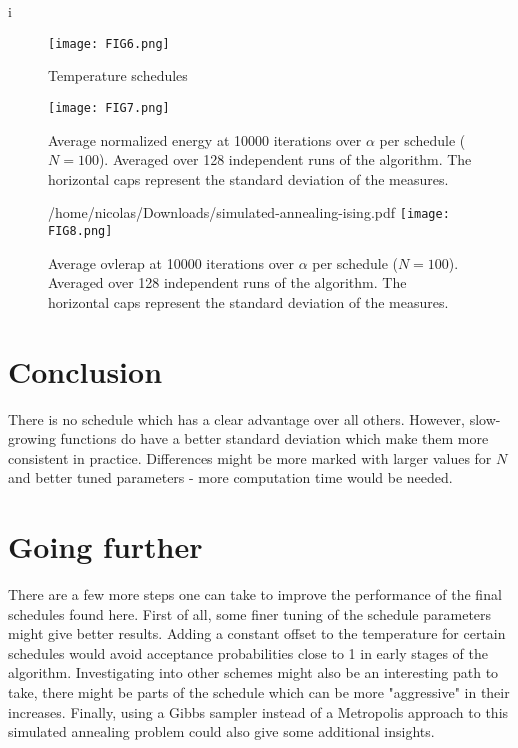 i\documentclass[a4paper]{article}
\begin{document}
\begin{figure}
\centering
\texttt{[image: FIG6.png]}
\caption{\label{fig:FIG6}Temperature schedules}
\end{figure}

\begin{figure}
\centering
\texttt{[image: FIG7.png]}
\caption{\label{fig:FIG7}Average normalized energy at 10000 iterations over $\alpha$ per schedule ($N = 100$). Averaged over 128 independent runs of the algorithm. The horizontal caps represent the standard deviation of the measures.}
\end{figure}

\begin{figure}
\centering/home/nicolas/Downloads/simulated-annealing-ising.pdf
\texttt{[image: FIG8.png]}
\caption{\label{fig:FIG8}Average ovlerap at 10000 iterations over $\alpha$ per schedule ($N = 100$). Averaged over 128 independent runs of the algorithm. The horizontal caps represent the standard deviation of the measures.}
\end{figure}

\section{Conclusion}
There is no schedule which has a clear advantage over all others. However, slow-growing functions do have a better standard deviation which make them more consistent in practice. Differences might be more marked with larger values for $N$ and better tuned parameters - more computation time would be needed.

\section{Going further}
There are a few more steps one can take to improve the performance of the final schedules found here. First of all, some finer tuning of the schedule parameters might give better results. Adding a constant offset to the temperature for certain schedules would avoid acceptance probabilities close to 1 in early stages of the algorithm. Investigating into other schemes might also be an interesting path to take, there might be parts of the schedule which can be more "aggressive" in their increases. Finally, using a Gibbs sampler instead of a Metropolis approach to this simulated annealing problem could also give some additional insights.
\end{document}
